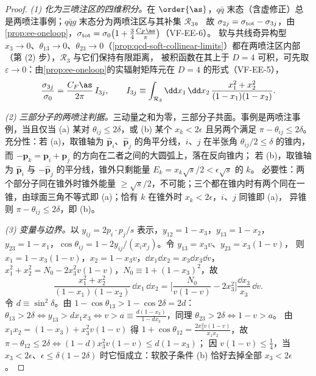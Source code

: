 \begin{proof}
\emph{(1) 化为三喷注区的四维积分。}在 $\order{\as}$，$q\bar q$ 末态（含虚修正）总是两喷注事例；$q\bar qg$ 末态分为两喷注区与其补集 $\mathcal R_3$。
故 $\sigma_{2j}=\sigma_{\rm tot}-\sigma_{3j}$，由\cref{prop:ee-oneloop}，$\sigma_{\rm tot}=\sigma_0\big(1+\frac34\frac{C_F\as}{\pi}\big)$（VF-EE-6）。%
软与共线奇异构型 $x_3\to0$、$\theta_{13}\to0$、$\theta_{23}\to0$（\cref{prop:qcd-soft-collinear-limits}）都在两喷注区内部（第 (2) 步），$\mathcal R_3$ 与它们保持有限距离，
被积函数在其上于 $D=4$ 可积，可先取 $\varepsilon\to0$：由\cref{prop:ee-oneloop}的实辐射矩阵元在 $D=4$ 的形式（VF-EE-5），%
\begin{equation}\label{eq:jets-sigma3}
\frac{\sigma_{3j}}{\sigma_0}=\frac{C_F\as}{2\pi}\,I_{3j},\qquad
I_{3j}\equiv\int_{\mathcal R_3}\dd x_1\,\dd x_2\,\frac{x_1^2+x_2^2}{(1-x_1)(1-x_2)} .
\end{equation}

\emph{(2) 三部分子的两喷注判据。}三动量之和为零，三部分子共面。事例是两喷注事例，当且仅当
(a) 某对 $\theta_{ij}\le2\delta$，或 (b) 某个 $x_k<2\epsilon$ 且另两个满足 $\pi-\theta_{ij}\le2\delta$。
充分性：若 (a)，取锥轴为 $\hat{\bm p}_i$、$\hat{\bm p}_j$ 的角平分线，$i$、$j$ 在半张角 $\theta_{ij}/2\le\delta$ 的锥内，而 $-\bm p_k=\bm p_i+\bm p_j$ 的方向在二者之间的大圆弧上，落在反向锥内；
若 (b)，取锥轴为 $\hat{\bm p}_i$ 与 $-\hat{\bm p}_j$ 的平分线，锥外只剩能量 $E_k=x_k\sqrt s/2<\epsilon\sqrt s$ 的 $k$。
必要性：两个部分子同在锥外时锥外能量 $\ge\sqrt s/2$，不可能；三个都在锥内时有两个同在一锥，由球面三角不等式即 (a)；恰有 $k$ 在锥外时 $x_k<2\epsilon$，$i$、$j$ 同锥即 (a)，
异锥则 $\pi-\theta_{ij}\le2\delta$，即 (b)。

\emph{(3) 变量与边界。}以 $y_{ij}=2p_i\cdot p_j/s$ 表示，$y_{12}=1-x_3$，$y_{13}=1-x_2$，$y_{23}=1-x_1$，$\cos\theta_{ij}=1-2y_{ij}/(x_ix_j)$。令 $y_{13}=x_3v$、$y_{23}=x_3(1-v)$，
则 $x_1=1-x_3(1-v)$，$x_2=1-x_3v$，$\dd x_1\dd x_2=x_3\dd x_3\dd v$，$x_1^2+x_2^2=N_0-2x_3^2v(1-v)$，$N_0\equiv1+(1-x_3)^2$，故
\begin{equation}\label{eq:jets-measure}
\frac{x_1^2+x_2^2}{(1-x_1)(1-x_2)}\,\dd x_1\,\dd x_2=\Big[\frac{N_0}{v(1-v)}-2x_3^2\Big]\frac{\dd x_3}{x_3}\,\dd v .
\end{equation}
令 $d\equiv\sin^2\delta$。由 $1-\cos\theta_{13}>1-\cos2\delta=2d$：$\theta_{13}>2\delta\iff y_{13}>dx_1x_3\iff v>a\equiv\frac{d(1-x_3)}{1-dx_3}$，同理 $\theta_{23}>2\delta\iff1-v>a$。
由 $x_1x_2=(1-x_3)+x_3^2v(1-v)$ 得 $1+\cos\theta_{12}=\frac{2x_3^2v(1-v)}{x_1x_2}$，故 $\pi-\theta_{12}\le2\delta\iff(1-d)x_3^2v(1-v)\le d(1-x_3)$；
因 $v(1-v)\le\frac14$，当 $x_3<2\epsilon$、$\epsilon\le\delta(1-2\delta)$ 时它恒成立：软胶子条件 (b) 恰好去掉全部 $x_3<2\epsilon$。


\end{proof}
